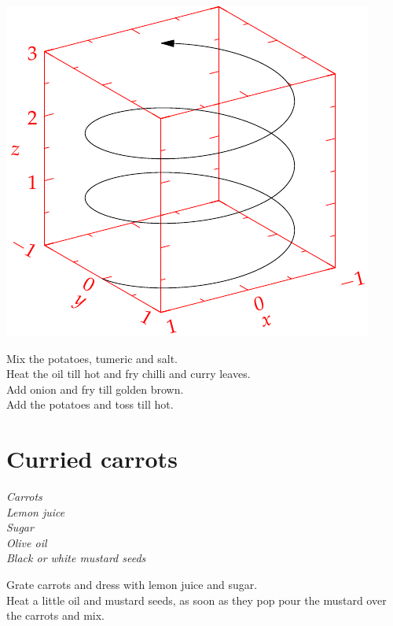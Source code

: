 \documentclass{tufte-book}
\begin{document}
\begin{marginfigure}%
  \includegraphics[width=\linewidth]{helix}
\end{marginfigure}

\smallskip
Mix the potatoes, tumeric and salt.
\\Heat the oil till hot and fry chilli and curry leaves.
\\Add onion and fry till golden brown.
\\Add the potatoes and toss till hot.


\section{Curried carrots}
\emph{Carrots
\\Lemon juice
\\Sugar
\\Olive oil
\\Black or white mustard seeds
}

\smallskip
Grate carrots and dress with lemon juice and sugar.
\\Heat a little oil and mustard seeds, as soon as they pop pour the mustard over the carrots and mix.
\end{document}
